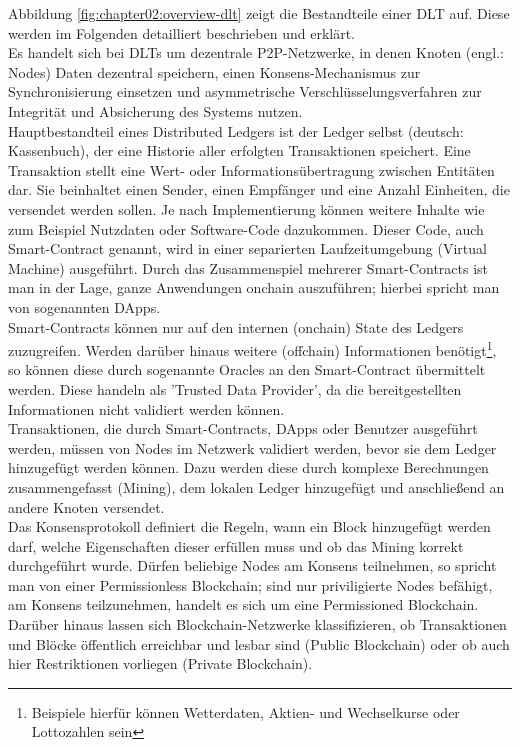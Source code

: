 Abbildung \ref{fig:chapter02:overview-dlt} zeigt die Bestandteile einer \ac{DLT} auf. Diese werden im Folgenden detailliert beschrieben und erklärt.\\
Es handelt sich bei \ac{DLT}s um dezentrale \ac{P2P}-Netzwerke, in denen Knoten (engl.: Nodes) Daten dezentral speichern, einen Konsens-Mechanismus zur Synchronisierung einsetzen und asymmetrische Verschlüsselungsverfahren zur Integrität und Absicherung des Systems nutzen. \cite{DLT2016}\\
Hauptbestandteil eines Distributed Ledgers ist der Ledger selbst (deutsch: Kassenbuch), der eine Historie aller erfolgten Transaktionen speichert. Eine Transaktion stellt eine Wert- oder Informationsübertragung zwischen Entitäten dar. Sie beinhaltet einen Sender, einen Empfänger und eine Anzahl Einheiten, die versendet werden sollen. Je nach Implementierung können weitere Inhalte wie zum Beispiel Nutzdaten oder Software-Code dazukommen. Dieser Code, auch Smart-Contract genannt, wird in einer separierten Laufzeitumgebung (Virtual Machine) ausgeführt. Durch das Zusammenspiel mehrerer Smart-Contracts ist man in der Lage, ganze Anwendungen onchain auszuführen; hierbei spricht man von sogenannten \ac{DApp}s.\\
Smart-Contracts können nur auf den internen (onchain) State des Ledgers zuzugreifen. Werden darüber hinaus weitere (offchain) Informationen benötigt\footnote{Beispiele hierfür können Wetterdaten, Aktien- und Wechselkurse oder Lottozahlen sein}, so können diese durch sogenannte Oracles an den Smart-Contract übermittelt werden. Diese handeln als 'Trusted Data Provider', da die bereitgestellten Informationen nicht validiert werden können. \cite{ORACLE2019}\\
Transaktionen, die durch Smart-Contracts, \ac{DApp}s oder Benutzer ausgeführt werden, müssen von Nodes im Netzwerk validiert werden, bevor sie dem Ledger hinzugefügt werden können. Dazu werden diese durch komplexe Berechnungen zusammengefasst (Mining), dem lokalen Ledger hinzugefügt und anschließend an andere Knoten versendet.\\
Das Konsensprotokoll definiert die Regeln, wann ein Block hinzugefügt werden darf, welche Eigenschaften dieser erfüllen muss und ob das Mining korrekt durchgeführt wurde. Dürfen beliebige Nodes am Konsens teilnehmen, so spricht man von einer Permissionless Blockchain; sind nur priviligierte Nodes befähigt, am Konsens teilzunehmen, handelt es sich um eine Permissioned Blockchain. Darüber hinaus lassen sich Blockchain-Netzwerke klassifizieren, ob Transaktionen und Blöcke öffentlich erreichbar und lesbar sind (Public Blockchain) oder ob auch hier Restriktionen vorliegen (Private Blockchain).\\
